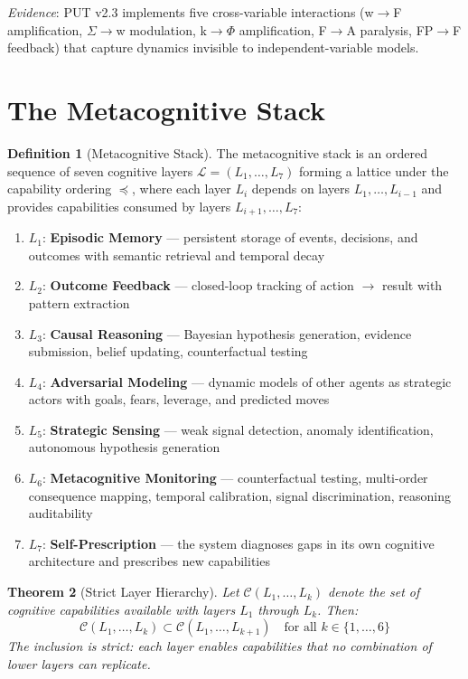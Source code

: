 \documentclass[12pt,a4paper]{article}
\theoremstyle{plain}
\newtheorem{theorem}{Theorem}[section]
\theoremstyle{definition}
\newtheorem{definition}[theorem]{Definition}
\theoremstyle{remark}
\begin{document}
\textit{Evidence}: PUT v2.3 implements five cross-variable interactions (w$\to$F amplification, $\Sigma\to$w modulation, k$\to\Phi$ amplification, F$\to$A paralysis, FP$\to$F feedback) that capture dynamics invisible to independent-variable models.

\section{The Metacognitive Stack}
\label{sec:stack}

\begin{definition}[Metacognitive Stack]
The metacognitive stack is an ordered sequence of seven cognitive layers $\mathcal{L} = (L_1, \ldots, L_7)$ forming a lattice under the capability ordering $\preceq$, where each layer $L_i$ depends on layers $L_1, \ldots, L_{i-1}$ and provides capabilities consumed by layers $L_{i+1}, \ldots, L_7$:

\begin{enumerate}[nosep]
\item $L_1$: \textbf{Episodic Memory} --- persistent storage of events, decisions, and outcomes with semantic retrieval and temporal decay
\item $L_2$: \textbf{Outcome Feedback} --- closed-loop tracking of action $\to$ result with pattern extraction
\item $L_3$: \textbf{Causal Reasoning} --- Bayesian hypothesis generation, evidence submission, belief updating, counterfactual testing
\item $L_4$: \textbf{Adversarial Modeling} --- dynamic models of other agents as strategic actors with goals, fears, leverage, and predicted moves
\item $L_5$: \textbf{Strategic Sensing} --- weak signal detection, anomaly identification, autonomous hypothesis generation
\item $L_6$: \textbf{Metacognitive Monitoring} --- counterfactual testing, multi-order consequence mapping, temporal calibration, signal discrimination, reasoning auditability
\item $L_7$: \textbf{Self-Prescription} --- the system diagnoses gaps in its own cognitive architecture and prescribes new capabilities
\end{enumerate}
\end{definition}

\begin{theorem}[Strict Layer Hierarchy]
\label{thm:hierarchy}
Let $\mathcal{C}(L_1, \ldots, L_k)$ denote the set of cognitive capabilities available with layers $L_1$ through $L_k$. Then:
\[
\mathcal{C}(L_1, \ldots, L_k) \subset \mathcal{C}(L_1, \ldots, L_{k+1}) \quad \text{for all } k \in \{1, \ldots, 6\}
\]
The inclusion is strict: each layer enables capabilities that no combination of lower layers can replicate.
\end{theorem}
\end{document}
